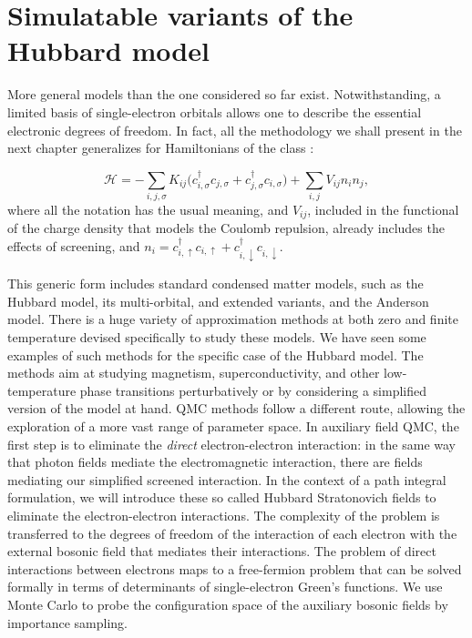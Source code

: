 \section{Simulatable variants of the Hubbard model}\label{sec:variants}

More general  models than the one considered so far exist.
Notwithstanding, a limited basis of single-electron orbitals allows one to describe the essential electronic degrees of freedom.
In fact, all the methodology we shall present in the next chapter generalizes for Hamiltonians of the class \cite{hanke_electronic_nodate}:

\begin{equation}\label{eq:variantsForm}
\mathcal{H} = - \sum_{i, j, \sigma} K_{ij} \bigg( c_{i, \sigma}^\dagger c_{j, \sigma} + c_{j, \sigma}^\dagger c_{i, \sigma} \bigg) + \sum_{i, j} V_{ij} n_i n_j ,
\end{equation}
where all the notation has the usual meaning, and $V_{ij}$, included in the functional of the charge density that models the Coulomb repulsion, already includes the effects of screening, and $n_i = c_{i,\uparrow}^\dagger c_{i,\uparrow} + c_{i,\downarrow}^\dagger c_{i,\downarrow}$.

This generic form includes standard condensed matter models, such as the Hubbard model, its multi-orbital, and extended variants, and the Anderson model.
There is a huge variety of approximation methods at both zero and finite temperature devised specifically to study these models.
We have seen some examples of such methods for the specific case of the Hubbard model.
The methods aim at studying magnetism, superconductivity, and other low-temperature phase transitions perturbatively or by considering a  simplified version of the model at hand.
\ac{QMC} methods follow a different route, allowing the exploration of a more vast range of parameter space.
In auxiliary field \ac{QMC}, the first step is to eliminate the \emph{direct} electron-electron interaction: in the same way that photon fields mediate the electromagnetic interaction, there are fields mediating our simplified screened interaction.
In the context of a path integral formulation, we will introduce these so called Hubbard Stratonovich fields to eliminate the electron-electron interactions.
The complexity of the problem is transferred to the degrees of freedom of the interaction of each electron with the external bosonic field that mediates their interactions.
The problem of direct interactions between electrons maps to a free-fermion problem that can be solved formally in terms of determinants of single-electron Green's functions.
We use Monte Carlo to probe the configuration space of the auxiliary bosonic fields by importance sampling.

